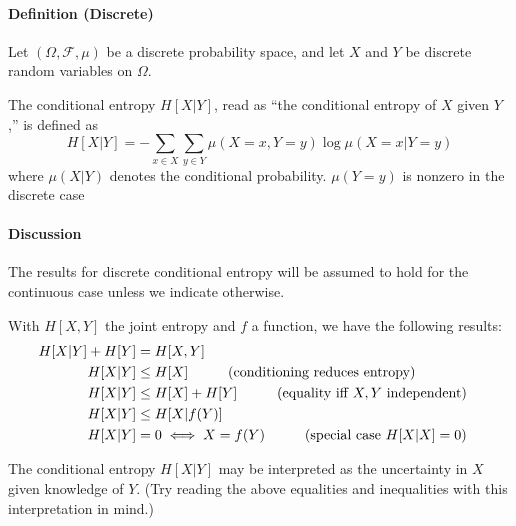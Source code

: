 \documentclass{article}
\begin{document}
\paragraph{Definition (Discrete)}
Let $(\Omega, \mathcal{F}, \mu)$ be a discrete probability space, and let $X$ and $Y$ be discrete random variables on $\Omega$.

The conditional entropy $H[X|Y]$, read as ``the conditional entropy of $X$ given $Y$,'' is defined as
\begin{equation}
H[X|Y] = -\sum_{x \in X}\sum_{y \in Y} \mu(X=x,Y=y) \log \mu(X=x|Y=y)
\end{equation}
where $\mu(X|Y)$ denotes the conditional probability. $\mu(Y=y)$ is nonzero in the
discrete case

\paragraph{Discussion}
The results for discrete conditional entropy will be assumed to hold for the continuous case unless we indicate otherwise.

With $H[X,Y]$ the joint entropy and $f$ a function, we have the following results:
\begin{align}
H[X|Y] + H[Y]&= H[X,Y]&\\
H[X|Y] &\le H[X] \hspace{10mm}\text{(conditioning reduces entropy)}\\
H[X|Y] &\le H[X] + H[Y] \hspace{10mm}\text{(equality iff } X, Y \text{ independent)}\\
H[X|Y] &\le H[X|f(Y)]&\\
H[X|Y] &= 0 \iff X=f(Y)\hspace{10mm}\text{(special case } H[X|X] = 0 \text{)}\\
\end{align}

The conditional entropy $H[X|Y]$ may be interpreted as the uncertainty in $X$ given knowledge of $Y$.  (Try reading the above equalities and inequalities with this interpretation in mind.)

\end{document}
